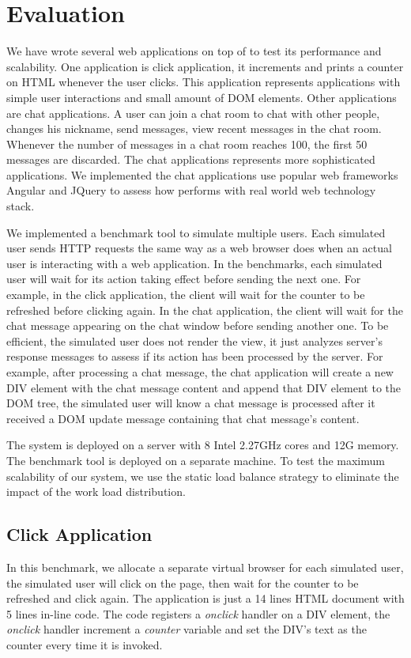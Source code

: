 \section{Evaluation}
\label{sec:eval}
We have wrote several web applications on top of \cb{} to test its
performance and scalability.
One application is click application,
it increments and prints a counter on HTML whenever the user clicks.
This application represents applications with simple user interactions and small amount of DOM elements.
Other applications are chat applications.
A user can join a chat room to chat with other people,
changes his nickname, send messages, view recent messages in the chat room.
Whenever the number of messages in a chat room reaches 100, the first 50 messages
are discarded.
The chat applications represents more sophisticated applications.
We implemented the chat applications use popular web frameworks Angular and JQuery
to assess how \cb{} performs with real world web technology stack.


\chatroomfig{}

We implemented a benchmark tool to simulate multiple users.
Each simulated user sends HTTP requests the same way as
a web browser does when an actual user is interacting with a web application.
In the benchmarks, each simulated user will wait for its action taking effect before 
sending the next one.
For example, in the click application, the client will wait for the counter
to be refreshed before clicking again.
In the chat application, the client will wait for
the chat message appearing on the chat window before sending another one.
To be efficient, the simulated user does not render the view, 
it just analyzes server's response messages to assess 
if its action has been processed by the server.
For example, after processing a chat message, 
the chat application will create a new DIV element with the chat message content
and append that DIV element to the DOM tree, 
the simulated user will know a chat message is processed after it received
a DOM update message containing that chat message's content.

The \cb{} system is deployed on a server with 8 Intel 2.27GHz cores and 12G memory.
The benchmark tool is deployed on a separate machine.
To test the maximum scalability of our system, we use the static load balance strategy
to eliminate the impact of the work load distribution.

\subsection{Click Application}
In this benchmark,
we allocate a separate virtual browser for each simulated user,
the simulated user will click on the page, 
then wait for the counter to be refreshed and click again.
The application is just a 14 lines HTML document with 5 lines in-line \js{} code.
The \js{} code registers a \emph{onclick} handler on a DIV element,
the \emph{onclick} handler increment a \emph{counter} variable and set the DIV's text as
the counter every time it is invoked.
\clickthroughput{}

